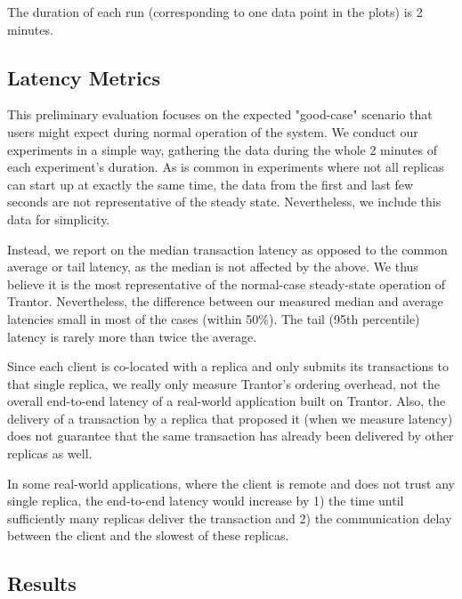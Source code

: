 \documentclass{article}
\begin{document}
The duration of each run (corresponding to one data point in the plots) is 2 minutes.

\subsection{Latency Metrics}

This preliminary evaluation focuses on the expected "good-case" scenario that users might expect during normal operation of the system.
We conduct our experiments in a simple way, gathering the data during the whole 2 minutes of each experiment's duration.
As is common in experiments where not all replicas can start up at exactly the same time,
the data from the first and last few seconds are not representative of the steady state.
Nevertheless, we include this data for simplicity.

Instead, we report on the median transaction latency as opposed to the common average or tail latency, as the median is not affected by the above.
We thus believe it is the most representative of the normal-case steady-state operation of Trantor.
Nevertheless, the difference between our measured median and average latencies small in most of the cases (within 50\%).
The tail (95th percentile) latency is rarely more than twice the average.

Since each client is co-located with a replica and only submits its transactions to that single replica,
we really only measure Trantor's ordering overhead, not the overall end-to-end latency of a real-world application built on Trantor.
Also, the delivery of a transaction by a replica that proposed it (when we measure latency)
does not guarantee that the same transaction has already been delivered by other replicas as well.

In some real-world applications, where the client is remote and does not trust any single replica,
the end-to-end latency would increase by
1) the time until sufficiently many replicas deliver the transaction and
2) the communication delay between the client and the slowest of these replicas.

\subsection{Results}
\end{document}
